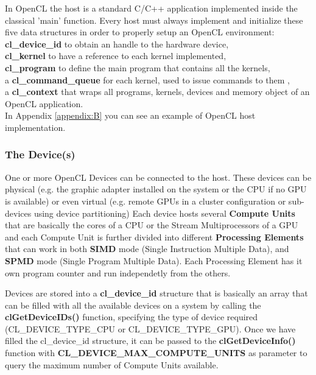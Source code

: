\begin{CLCode}
In OpenCL the host is a standard C/C++ application implemented inside the classical 'main' function. Every host must always implement and initialize these five data structures in order to properly setup an OpenCL environment:\\
\textbf{cl\_device\_id} to obtain an handle to the hardware device,\\
\textbf{cl\_kernel} to have a reference to each kernel implemented,\\
\textbf{cl\_program} to define the main program that contains all the kernels,\\
a \textbf{cl\_command\_queue} for each kernel, used to issue commands to them ,\\
a \textbf{cl\_context} that wraps all programs, kernels, devices and memory object of an OpenCL application.\\
In Appendix \ref{appendix:B} you can see an example of OpenCL host implementation.
\end{CLCode}


\subsubsection{The Device(s)}
One or more OpenCL Devices can be connected to the host. These devices can be physical (e.g. the graphic adapter installed on the system or the CPU if no GPU is available) or even virtual (e.g. remote GPUs in a cluster configuration or sub-devices using device partitioning)
Each device hosts several \textbf{Compute Units} that are basically the cores of a CPU or the Stream Multiprocessors of a GPU and each Compute Unit is further divided into different \textbf{Processing Elements} that can work in both \textbf{SIMD} mode (Single Instruction Multiple Data), and \textbf{SPMD} mode (Single Program Multiple Data).
Each Processing Element has it own program counter and run independetly from the others.

\begin{CLCode}
Devices are stored into a \textbf{cl\_device\_id} structure that is basically an array that can be filled with  all the available devices on a system by calling the \textbf{clGetDeviceIDs()} function, specifying the type of device required (CL\_DEVICE\_TYPE\_CPU or CL\_DEVICE\_TYPE\_GPU). Once we have filled the cl\_device\_id structure, it can be passed to the \textbf{clGetDeviceInfo()} function  with \textbf{CL\_DEVICE\_MAX\_COMPUTE\_UNITS} as parameter to query the maximum number of Compute Units available.
\end{CLCode}


